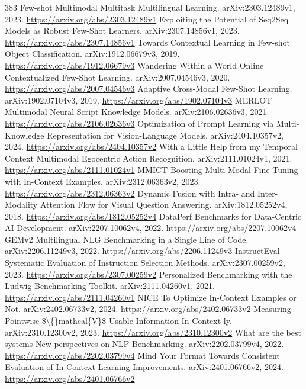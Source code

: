 \documentclass[11pt]{article}
\begin{document}
\begin{thebibliography}{383}
 Few-shot Multimodal Multitask Multilingual Learning. arXiv:2303.12489v1, 2023. \url{https://arxiv.org/abs/2303.12489v1}
 Exploiting the Potential of Seq2Seq Models as Robust Few-Shot Learners. arXiv:2307.14856v1, 2023. \url{https://arxiv.org/abs/2307.14856v1}
 Towards Contextual Learning in Few-shot Object Classification. arXiv:1912.06679v3, 2019. \url{https://arxiv.org/abs/1912.06679v3}
 Wandering Within a World Online Contextualized Few-Shot Learning. arXiv:2007.04546v3, 2020. \url{https://arxiv.org/abs/2007.04546v3}
 Adaptive Cross-Modal Few-Shot Learning. arXiv:1902.07104v3, 2019. \url{https://arxiv.org/abs/1902.07104v3}
 MERLOT Multimodal Neural Script Knowledge Models. arXiv:2106.02636v3, 2021. \url{https://arxiv.org/abs/2106.02636v3}
 Optimization of Prompt Learning via Multi-Knowledge Representation for Vision-Language Models. arXiv:2404.10357v2, 2024. \url{https://arxiv.org/abs/2404.10357v2}
 With a Little Help from my Temporal Context Multimodal Egocentric Action Recognition. arXiv:2111.01024v1, 2021. \url{https://arxiv.org/abs/2111.01024v1}
 MMICT Boosting Multi-Modal Fine-Tuning with In-Context Examples. arXiv:2312.06363v2, 2023. \url{https://arxiv.org/abs/2312.06363v2}
 Dynamic Fusion with Intra- and Inter- Modality Attention Flow for Visual Question Answering. arXiv:1812.05252v4, 2018. \url{https://arxiv.org/abs/1812.05252v4}
 DataPerf Benchmarks for Data-Centric AI Development. arXiv:2207.10062v4, 2022. \url{https://arxiv.org/abs/2207.10062v4}
 GEMv2 Multilingual NLG Benchmarking in a Single Line of Code. arXiv:2206.11249v3, 2022. \url{https://arxiv.org/abs/2206.11249v3}
 InstructEval Systematic Evaluation of Instruction Selection Methods. arXiv:2307.00259v2, 2023. \url{https://arxiv.org/abs/2307.00259v2}
 Personalized Benchmarking with the Ludwig Benchmarking Toolkit. arXiv:2111.04260v1, 2021. \url{https://arxiv.org/abs/2111.04260v1}
 NICE To Optimize In-Context Examples or Not. arXiv:2402.06733v2, 2024. \url{https://arxiv.org/abs/2402.06733v2}
 Measuring Pointwise \$\textbackslash\{\}mathcal\{V\}\$-Usable Information In-Context-ly. arXiv:2310.12300v2, 2023. \url{https://arxiv.org/abs/2310.12300v2}
 What are the best systems New perspectives on NLP Benchmarking. arXiv:2202.03799v4, 2022. \url{https://arxiv.org/abs/2202.03799v4}
 Mind Your Format Towards Consistent Evaluation of In-Context Learning Improvements. arXiv:2401.06766v2, 2024. \url{https://arxiv.org/abs/2401.06766v2}

\end{thebibliography}
\end{document}
